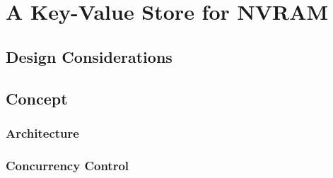 \chapter{A Key-Value Store for NVRAM}
\label{ch:concept}

\section{Design Considerations}
\section{Concept}
\subsection{Architecture}
\subsection{Concurrency Control}
